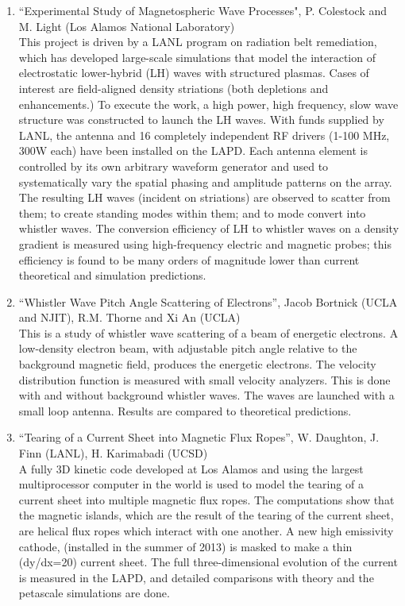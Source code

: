 \documentclass[11pt]{article}
\begin{document}
\begin{enumerate}
\item ``Experimental Study of Magnetospheric Wave Processes",
P. Colestock and M. Light (Los Alamos National Laboratory)\\
This project is driven by a LANL program on radiation belt remediation, which has developed large-scale simulations that model the interaction of electrostatic lower-hybrid (LH) waves with structured plasmas.  Cases of interest are field-aligned density striations (both depletions and enhancements.) To execute the work, a high power, high frequency, slow wave structure was constructed to launch the LH waves. With funds supplied by LANL, the antenna and 16 completely independent RF drivers (1-100 MHz, 300W each) have been installed on the LAPD. Each antenna element is controlled by its own arbitrary waveform generator and used to systematically vary the spatial phasing and amplitude patterns on the array.  The resulting LH waves (incident on striations) are observed to scatter from them; to create standing modes within them; and to mode convert into whistler waves.  The conversion efficiency of LH to whistler waves on a density gradient is measured using high-frequency electric and magnetic probes; this efficiency is found to be many orders of magnitude lower than current theoretical and simulation predictions. 

\item ``Whistler Wave Pitch Angle Scattering of Electrons'', Jacob
  Bortnick (UCLA and NJIT), R.M. Thorne and Xi An (UCLA)\\
  This is a study of
  whistler wave scattering of a beam of energetic electrons. A
  low-density electron beam, with adjustable pitch angle relative to
  the background magnetic field, produces the energetic
  electrons. The velocity distribution function is measured with
  small velocity analyzers. This is done with and without
  background whistler waves. The waves are launched with a small
  loop antenna. Results are compared to theoretical predictions.

\item ``Tearing of a Current Sheet into Magnetic Flux Ropes'',
  W. Daughton, J. Finn (LANL), H. Karimabadi (UCSD)\\ A fully 3D
  kinetic code developed at Los Alamos and using the largest
  multiprocessor computer in the world is used to model the
  tearing of a current sheet into multiple magnetic flux ropes. The
   computations show that the magnetic islands,
  which are the result of the tearing of the current sheet, are helical
  flux ropes which interact with one another. A new high emissivity
  cathode, (installed in the summer of 2013) is masked to
  make a thin (dy/dx=20) current sheet. The full three-dimensional
  evolution of the current is measured in the LAPD, and detailed
  comparisons with theory and the petascale simulations are done.



\end{enumerate}
\end{document}
